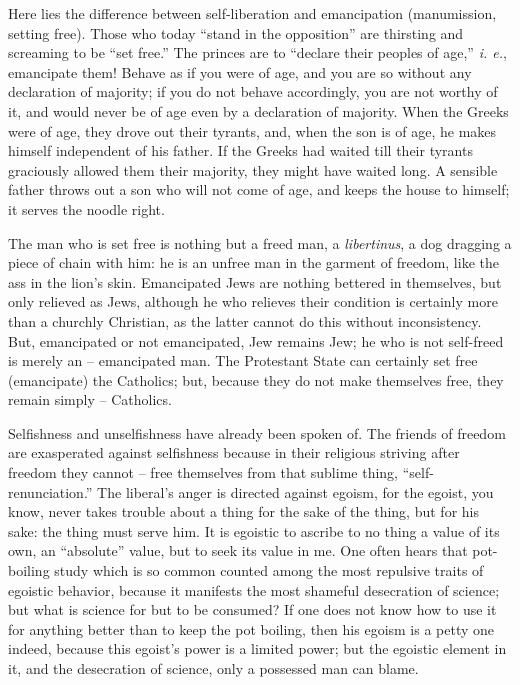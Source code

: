 \documentclass[12pt,a4paper]{book}
\begin{document}
Here lies the difference between self-liberation and emancipation 
(manumission, setting free). Those who today ``stand in the opposition'' are 
thirsting and screaming to be ``set free.'' The princes are to ``declare 
their peoples of age,'' \textit{i. e.}, emancipate them! Behave as if you 
were of age, and you are so without any declaration of majority; if you do not 
behave accordingly, you are not worthy of it, and would never be of age even 
by a declaration of majority. When the Greeks were of age, they drove out 
their tyrants, and, when the son is of age, he makes himself independent of 
his father. If the Greeks had waited till their tyrants graciously allowed 
them their majority, they might have waited long. A sensible father throws out 
a son who will not come of age, and keeps the house to himself; it serves the 
noodle right.

The man who is set free is nothing but a freed man, a \textit{libertinus}, a 
dog dragging a piece of chain with him: he is an unfree man in the garment of 
freedom, like the ass in the lion's skin. Emancipated Jews are nothing 
bettered in themselves, but only relieved as Jews, although he who relieves 
their condition is certainly more than a churchly Christian, as the latter 
cannot do this without inconsistency. But, emancipated or not emancipated, Jew 
remains Jew; he who is not self-freed is merely an -- emancipated man. The 
Protestant State can certainly set free (emancipate) the Catholics; but, 
because they do not make themselves free, they remain simply -- Catholics.

Selfishness and unselfishness have already been spoken of. The friends of 
freedom are exasperated against selfishness because in their religious 
striving after freedom they cannot -- free themselves from that sublime thing, 
``self-renunciation.'' The liberal's anger is directed against egoism, for 
the egoist, you know, never takes trouble about a thing for the sake of the 
thing, but for his sake: the thing must serve him. It is egoistic to ascribe 
to no thing a value of its own, an ``absolute'' value, but to seek its value 
in me. One often hears that pot-boiling study which is so common counted among 
the most repulsive traits of egoistic behavior, because it manifests the most 
shameful desecration of science; but what is science for but to be consumed? 
If one does not know how to use it for anything better than to keep the pot 
boiling, then his egoism is a petty one indeed, because this egoist's power is 
a limited power; but the egoistic element in it, and the desecration of 
science, only a possessed man can blame.
\end{document}
